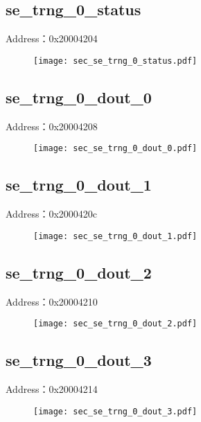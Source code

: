 \subsection{se\_trng\_0\_status}
\label{sec-se-trng-0-status}
Address：0x20004204
 \begin{figure}[H]
\texttt{[image: sec\_se\_trng\_0\_status.pdf]}
\end{figure}

\subsection{se\_trng\_0\_dout\_0}
\label{sec-se-trng-0-dout-0}
Address：0x20004208
 \begin{figure}[H]
\texttt{[image: sec\_se\_trng\_0\_dout\_0.pdf]}
\end{figure}

\subsection{se\_trng\_0\_dout\_1}
\label{sec-se-trng-0-dout-1}
Address：0x2000420c
 \begin{figure}[H]
\texttt{[image: sec\_se\_trng\_0\_dout\_1.pdf]}
\end{figure}

\subsection{se\_trng\_0\_dout\_2}
\label{sec-se-trng-0-dout-2}
Address：0x20004210
 \begin{figure}[H]
\texttt{[image: sec\_se\_trng\_0\_dout\_2.pdf]}
\end{figure}

\subsection{se\_trng\_0\_dout\_3}
\label{sec-se-trng-0-dout-3}
Address：0x20004214
 \begin{figure}[H]
\texttt{[image: sec\_se\_trng\_0\_dout\_3.pdf]}
\end{figure}

